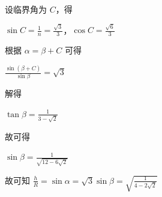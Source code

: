 \documentclass[\gkver]{gaokaozhenti}
\begin{document}
\begin{enumerate}
{设临界角为 $C$，得

$\sin C = \frac{1}{n} = \frac{\sqrt{3}}{3}$，$\cos C = \frac{\sqrt{6}}{3}$

根据 $\alpha = \beta + C$ 可得

$\frac{\sin(\beta + C)}{\sin\beta} = \sqrt{3}$


解得

$\tan\beta = \frac{1}{3 - \sqrt{2}}$

故可得

$\sin\beta = \frac{1}{\sqrt{12 - 6\sqrt{2}}}$

故可知 $\frac{h}{R} = \sin\alpha = \sqrt{3}\sin\beta = \sqrt{\frac{1}{4 - 2\sqrt{2}}}$
}

\end{enumerate}
\end{document}
